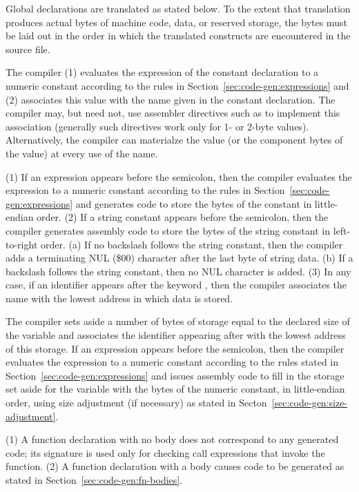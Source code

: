 \documentclass[10pt]{article}
\begin{document}
Global declarations are translated as stated below.  To the extent
that translation produces actual bytes of machine code, data, or
reserved storage, the bytes must be laid out in the order in which the
translated constructs are encountered in the source file.

 The compiler (1) evaluates the
expression of the constant declaration to a numeric constant according
to the rules in Section~\ref{sec:code-gen:expressions} and (2)
associates this value with the name given in the constant declaration.
The compiler may, but need not, use assembler directives such as
 to implement this association (generally such directives
work only for 1- or 2-byte values).  Alternatively, the compiler can
materialze the value (or the component bytes of the value) at every
use of the name.

 (1) If an expression appears before the
semicolon, then the compiler evaluates the expression to a numeric
constant according to the rules in
Section~\ref{sec:code-gen:expressions} and generates code to store the
bytes of the constant in little-endian order.  (2) If a string
constant appears before the semicolon, then the compiler generates
assembly code to store the bytes of the string constant in
left-to-right order.  (a) If no backslash \kwd{\bs} follows the string
constant, then the compiler adds a terminating NUL (\$00) character
after the last byte of string data. (b) If a backslash follows the
string constant, then no NUL character is added.  (3) In any case, if
an identifier appears after the keyword , then the compiler
associates the name with the lowest address in which data is stored.

 The compiler sets aside a
number of bytes of storage equal to the declared size of the variable
and associates the identifier appearing after  with the
lowest address of this storage.  If an expression appears before the
semicolon, then the compiler evaluates the expression to a numeric
constant according to the rules stated in
Section~\ref{sec:code-gen:expressions} and issues assembly code to
fill in the storage set aside for the variable with the bytes of the
numeric constant, in little-endian order, using size adjustment (if
necessary) as stated in Secton~\ref{sec:code-gen:size-adjustment}.

 (1) A function declaration with no
body does not correspond to any generated code; its signature is used
only for checking call expressions that invoke the function.  (2) A
function declaration with a body causes code to be generated as stated
in Section~\ref{sec:code-gen:fn-bodies}.
\end{document}
